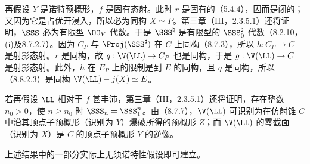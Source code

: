  再假设 $Y$ 是诺特预概形，$f$ 是固有态射。此时 $r$ 是固有的（5.4.4），因而是闭的；又因为它是占优开浸入，所以必为同构 $X\simeq P$。第三章（III，2.3.5.1）还将证明，$\SSS$ 必为有限型 $\OO_Y$-代数。于是 $\SSS^{\natural}$ 是有限型的 $\SSS^{\natural}_0$-代数（8.2.10，(i)及8.7.2.7）。因为 $C_P$ 与 $\Proj(\SSS^{\natural})$ 在 $C$ 上同构（8.7.3），所以 $h:C_P\to C$ 是射影态射。$r$ 是同构，故 $q:\V(\LL)\to C_P$ 也是同构，于是 $g:\V(\LL)\to C$ 是射影态射。此外，$h$ 在 $E_P$ 上的限制是到 $E$ 的同构，且 $q$ 是同构，所以（8.8.2.3）是同构 $\V(\LL)-j(X)\simeq E$。

若再假设 $\LL$ 相对于 $f$ 甚丰沛，第三章（III，2.3.5.1）还将证明，存在整数 $n_0>0$，使 $n\geq n_0$ 时 $\SSS_n=\SSS_1^n$。由（8.7.7），$\V(\LL)$ 可识别为在仿射锥 $C$ 中沿其顶点子预概形（识别为 $Y$）爆破所得的预概形 $Z$；而 $\V(\LL)$ 的零截面（识别为 $X$）是 $C$ 的顶点子预概形 $Y$ 的逆像。

上述结果中的一部分实际上无须诺特性假设即可建立。

